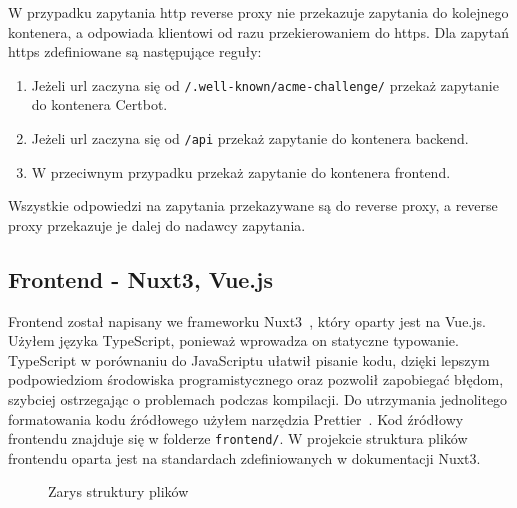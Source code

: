 \documentclass[shortabstract]{iithesis}
\begin{document}
W przypadku zapytania http reverse proxy nie przekazuje zapytania do kolejnego kontenera, a odpowiada klientowi od razu przekierowaniem do https. Dla zapytań https zdefiniowane są następujące reguły:
\begin{enumerate}
    \item Jeżeli url zaczyna się od \texttt{/.well-known/acme-challenge/} przekaż zapytanie do kontenera Certbot.
    \item Jeżeli url zaczyna się od \texttt{/api} przekaż zapytanie do kontenera backend.
    \item W przeciwnym przypadku przekaż zapytanie do kontenera frontend.
\end{enumerate}
Wszystkie odpowiedzi na zapytania przekazywane są do reverse proxy, a reverse proxy przekazuje je dalej do nadawcy zapytania.

\subsection{Frontend - Nuxt3, Vue.js}
Frontend został napisany we frameworku Nuxt3~\cite{Nuxt3}, który oparty jest na Vue.js.
Użyłem języka TypeScript, ponieważ wprowadza on statyczne typowanie.
TypeScript w porównaniu do JavaScriptu ułatwił pisanie kodu, dzięki lepszym podpowiedziom środowiska programistycznego oraz pozwolił zapobiegać błędom, szybciej ostrzegając o problemach podczas kompilacji.
Do utrzymania jednolitego formatowania kodu źródłowego użyłem narzędzia Prettier~\cite{Prettier}.
Kod źródłowy frontendu znajduje się w folderze \texttt{frontend/}. W projekcie struktura plików frontendu oparta jest na
standardach zdefiniowanych w dokumentacji Nuxt3.
\begin{figure}[H]
    \caption{Zarys struktury plików}
\end{figure}
\end{document}

